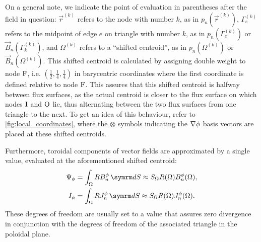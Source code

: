 On a general note, we indicate the point of evaluation in parentheses after the field in question: $\vec{r}^{(k)}$ refers to the node with number $k$, as in $p_{n} (\vec{r}^{(k)})$, $\Gamma_{e}^{(k)}$ refers to the midpoint of edge $e$ on triangle with number $k$, as in $p_{n} (\Gamma_{e}^{(k)})$ or $\vec{B}_{n} (\Gamma_{k}^{(k)})$, and $\Omega^{(k)}$ refers to a \enquote{shifted centroid}, as in $p_{n} (\Omega^{(k)})$ or $\vec{B}_{n} (\Omega^{(k)})$. This shifted centroid is calculated by assigning double weight to node $\textrm{F}$, i.e. $\left ( \frac{1}{2}, \frac{1}{4}, \frac{1}{4} \right )$ in barycentric coordinates where the first coordinate is defined relative to node $\textrm{F}$. This assures that this shifted centroid is halfway between flux surfaces, as the actual centroid is closer to the flux surface on which nodes $\textrm{I}$ and $\textrm{O}$ lie, thus alternating between the two flux surfaces from one triangle to the next. To get an idea of this behaviour, refer to \cref{fig:local_coordinates}, where the $\otimes$ symbols indicating the $\grad \phi$ basis vectors are placed at these shifted centroids.

Furthermore, toroidal components of vector fields are approximated by a single value, evaluated at the aforementioned shifted centroid:
\begin{gather}
  \Psi_{\phi} = \int_{\Omega} R B_{n}^{\phi} \, \diff S \approx S_{\Omega} R (\Omega) B_{n}^{\phi} (\Omega), \label{eq:Psi_phi} \\
  I_{\phi} = \int_{\Omega} R J_{n}^{\phi} \, \diff S \approx S_{\Omega} R (\Omega) J_{n}^{\phi} (\Omega). \label{eq:I_phi}
\end{gather}
These degrees of freedom are usually set to a value that assures zero divergence in conjunction with the degrees of freedom of the associated triangle in the poloidal plane.

